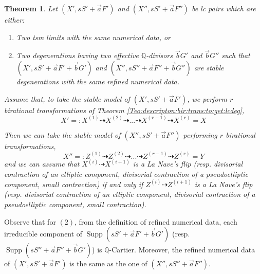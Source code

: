 \documentclass[11pt]{amsart}
\newcommand{\supp}{\operatorname{Supp}}
\newtheorem{Teo}[theorem]{Theorem}
\theoremstyle{definition}
\begin{document}
\begin{Teo}\label{Teo:stable:model:depends:only:on:num:data}
 Let $(X',sS'+\vec{a}F')$ and $(X'',sS'+\vec{a}F'')$ be lc pairs which are either:
 \begin{enumerate}
 \item Two tsm limits with the same numerical data, or
 \item Two degenerations having two effective $\mathbb{Q}$-divisors $\vec{b}G'$ and $\vec{b}G''$ such that $(X',sS'+\vec{a}F'+\vec{b}G')$ and $(X'',sS''+\vec{a}F''+\vec{b}G'')$ are stable degenerations with the same refined numerical data.
 \end{enumerate}
 
 
 Assume that, to take the stable model of $(X',sS'+\vec{a}F')$, we perform $r$ birational transformations of Theorem \ref{Teo:descripton:bir:trans:to:get:lcdeg},
 $$X'=:X^{(1)}\dashrightarrow X^{(2)}\dashrightarrow...\dashrightarrow X^{(r-1)}\dashrightarrow X^{(r)}=X$$
 
 Then we can take the stable model of $(X'',sS'+\vec{a}F'')$ performing $r$ birational transformations, 
 $$X''=:Z^{(1)}\dashrightarrow Z^{(2)}\dashrightarrow...\dashrightarrow Z^{(r-1)}\dashrightarrow Z^{(r)}=Y$$
 and we can assume that $X^{(i)} \dashrightarrow X^{(i+1)}$ is a La Nave's flip (resp. divisorial contraction of an elliptic component, divisorial contraction of a pseudoelliptic component, small contraction) if and only if
 $Z^{(i)} \dashrightarrow Z^{(i+1)}$ is a La Nave's flip (resp. divisorial contraction of an elliptic component, divisorial contraction of a pseudoelliptic component, small contraction). 
\end{Teo}
Observe that for $(2)$, from the definition of refined numerical data, each irreducible component of $\supp(sS'+\vec{a}F'+\vec{b}G')$ (resp. $\supp(sS''+\vec{a}F''+\vec{b}G')$) is $\mathbb{Q}$-Cartier. Moreover, the refined numerical data of $(X',sS'+\vec{a}F')$ is the same as the one of $(X'',sS''+\vec{a}F'')$.
\end{document}
